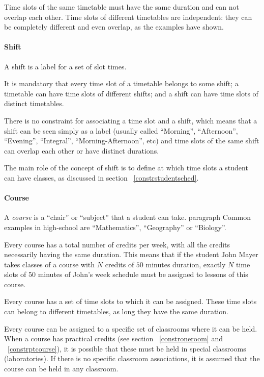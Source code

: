 Time slots of the same timetable must have the same duration and can not overlap each other. Time slots of different timetables are independent: they can be completely different and even overlap, as the examples have shown.


\paragraph{Shift}
\label{defshift}

A shift is a label for a set of slot times.

It is mandatory that every time slot of a timetable belongs to some shift; a timetable can have time slots of different shifts; and a shift can have time slots of distinct timetables.

There is no constraint for associating a time slot and a shift, which means that a shift can be seen simply as a label (usually called ``Morning'', ``Afternoon'', ``Evening'', ``Integral'', ``Morning-Afternoon'', etc) and time slots of the same shift can overlap each other or have distinct durations.

The main role of the concept of shift is to define at which time slots a student can have classes, as discussed in section ~\ref{constrstudentsched}.


\paragraph{Course}
\label{defcourse}

A \textit{course} is a ``chair'' or ``subject'' that a student can take.
paragraph
Common examples in high-school are ``Mathematics'', ``Geography'' or ``Biology''.

Every course has a total number of credits per week, with all the credits necessarily having the same duration. This means that if the student John Mayer takes classes of a course with $N$ credits of $50$ minutes duration, exactly $N$ time slots of $50$ minutes of John's week schedule must be assigned to lessons of this course.

Every course has a set of time slots to which it can be assigned. These time slots can belong to different timetables, as long they have the same duration.

Every course can be assigned to a specific set of classrooms where it can be held. When a course has practical credits (see section ~\ref{constroneroom} and ~\ref{constrptcourse}), it is possible that these must be held in special classrooms (laboratories). If there is no specific classroom associations, it is assumed that the course can be held in any classroom.



